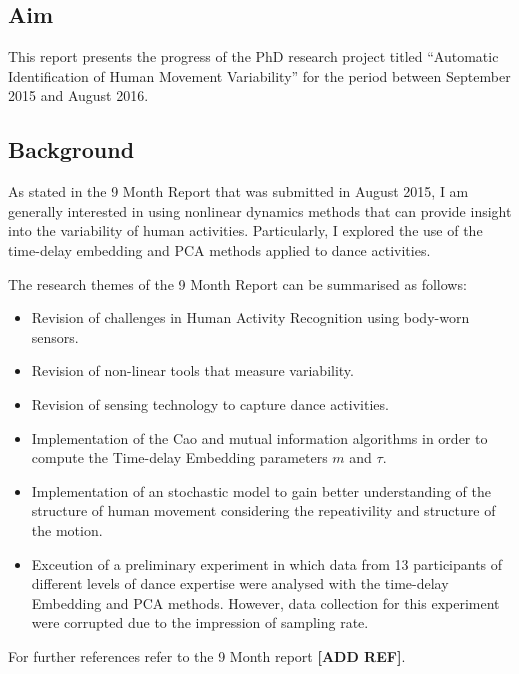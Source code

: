 \documentclass[11pt,journal,onecolumn,compsoc]{IEEEtran}
\begin{document}

\subsection{Aim}

This report presents the progress of the PhD research project titled
``Automatic Identification of Human Movement Variability'' 
for the period between September 2015 and August 2016.

\subsection{Background}
As stated in the 9 Month Report that was submitted in August 2015,
I am generally interested in using nonlinear dynamics methods 
that can provide insight into the variability of human activities.
Particularly, I explored the use of the time-delay embedding and PCA methods
applied to dance activities. 

The research themes of the 9 Month Report can be summarised as follows:

\begin{itemize}
 \item Revision of challenges in Human Activity Recognition using body-worn sensors.
 \item Revision of non-linear tools that measure variability.
 \item Revision of sensing technology to capture dance activities.
 \item Implementation of the Cao and mutual information algorithms in order 
    to compute the Time-delay Embedding parameters $m$ and $\tau$.
 \item Implementation of an stochastic model to gain better understanding of the 
 structure of human movement considering the repeativility and structure of the motion.
 \item Exceution of a preliminary experiment in which data from 13 participants of different 
 levels of dance expertise were analysed with the time-delay Embedding and PCA methods.
 However, data collection for this experiment were corrupted due to the impression of sampling rate.
\end{itemize}

For further references refer to the 9 Month report \textbf{[ADD REF]}.
\end{document}
